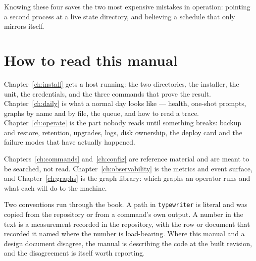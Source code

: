 Knowing these four saves the two most expensive mistakes in operation: pointing a second
process at a live state directory, and believing a schedule that only mirrors itself.

\section{How to read this manual}

Chapter~\ref{ch:install} gets a host running: the two directories, the installer, the
unit, the credentials, and the three commands that prove the result. Chapter~\ref{ch:daily}
is what a normal day looks like --- health, one-shot prompts, graphs by name and by file,
the queue, and how to read a trace. Chapter~\ref{ch:operate} is the part nobody reads
until something breaks: backup and restore, retention, upgrades, logs, disk ownership, the
deploy card and the failure modes that have actually happened.

Chapters~\ref{ch:commands} and~\ref{ch:config} are reference material and are meant to be
searched, not read. Chapter~\ref{ch:observability} is the metrics and event surface, and
Chapter~\ref{ch:graphs} is the graph library: which graphs an operator runs and what each
will do to the machine.

Two conventions run through the book. A path in \texttt{typewriter} is literal and was
copied from the repository or from a command's own output. A number in the text is a
measurement recorded in the repository, with the row or document that recorded it named
where the number is load-bearing. Where this manual and a design document disagree, the
manual is describing the code at the built revision, and the disagreement is itself worth
reporting.
